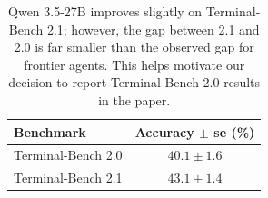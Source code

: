\documentclass{article}
\begin{document}
\begin{table}[h]
\centering
\caption{Qwen 3.5-27B improves slightly on Terminal-Bench 2.1; however, the gap between 2.1 and 2.0 is far smaller than the observed gap for frontier agents. This helps motivate our decision to report Terminal-Bench 2.0 results in the paper.}
\begin{tabular}{lc}
\toprule
Benchmark & Accuracy $\pm$ se (\%) \\
\midrule
Terminal-Bench 2.0 & $40.1 \pm 1.6$ \\
Terminal-Bench 2.1 & $43.1 \pm 1.4$ \\
\bottomrule
\end{tabular}
\label{tab:tb21}
\end{table}




% 
\end{document}
